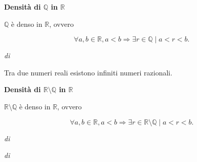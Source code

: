 \begin{theorem} \label{teo:raz-den-rea}
    \textbf{Densità di $\mathbb{Q}$ in $\mathbb{R}$}

    $\mathbb{Q}$ è denso in $\mathbb{R}$, ovvero

    \[ \forall a, b \in \mathbb{R}, a < b \Rightarrow \exists r\in\mathbb{Q} \mid a<r<b. \]

    
\end{theorem}

\begin{corollary} \textit{di} 

    Tra due numeri reali esistono infiniti numeri razionali.
\end{corollary}

\begin{theorem} \label{teo:irr-den-rea}
    \textbf{Densità di $\mathbb{R} \setminus\mathbb{Q}$ in $\mathbb{R}$}

    $\mathbb{R} \setminus\mathbb{Q}$ è denso in $\mathbb{R}$, ovvero

    \[ \forall a, b \in \mathbb{R}, a < b \Rightarrow \exists r\in\mathbb{R} \setminus\mathbb{Q} \mid a<r<b. \]
\end{theorem}

\begin{demonstration} \textit{di} 
    
\end{demonstration}

\begin{demonstration} \textit{di} 
    
\end{demonstration}
